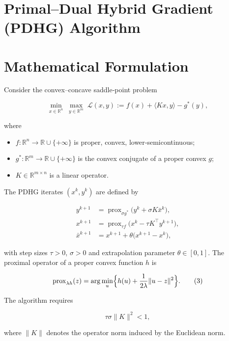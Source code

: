 \documentclass{article}
\newcommand{\prox}{\operatorname{prox}}
\begin{document}
\section*{Primal–Dual Hybrid Gradient (PDHG) Algorithm}

\section*{Mathematical Formulation}
Consider the convex–concave saddle‑point problem  

\[
\min_{x\in\mathbb{R}^n}\;\max_{y\in\mathbb{R}^m}
\; \mathcal{L}(x,y):= f(x)+\langle Kx , y\rangle - g^{*}(y),
\tag{1}
\]

where  

\begin{itemize}[noitemsep]
\item $f:\mathbb{R}^{n}\to\mathbb{R}\cup\{+\infty\}$ is proper, convex, lower‑semicontinuous;
\item $g^{*}:\mathbb{R}^{m}\to\mathbb{R}\cup\{+\infty\}$ is the convex conjugate of a proper convex $g$;
\item $K\in\mathbb{R}^{m\times n}$ is a linear operator.
\end{itemize}

The PDHG iterates $(x^{k},y^{k})$ are defined by  

\[
\boxed{
\begin{aligned}
y^{k+1} &= \prox_{\sigma g^{*}}\!\bigl(y^{k}+\sigma K\bar x^{k}\bigr),\\[4pt]
x^{k+1} &= \prox_{\tau f}\!\bigl(x^{k}-\tau K^{\top} y^{k+1}\bigr),\\[4pt]
\bar x^{k+1} &= x^{k+1}+ \theta\bigl(x^{k+1}-x^{k}\bigr),
\end{aligned}}
\tag{2}
\]

with step sizes $\tau>0$, $\sigma>0$ and extrapolation parameter $\theta\in[0,1]$.  
The proximal operator of a proper convex function $h$ is  

\[
\prox_{\lambda h}(z)=\arg\min_{u}\Bigl\{h(u)+\frac{1}{2\lambda}\|u-z\|^{2}\Bigr\}.
\tag{3}
\]

The algorithm requires  

\[
\tau\sigma\|K\|^{2}<1,
\tag{4}
\]

where $\|K\|$ denotes the operator norm induced by the Euclidean norm.
\end{document}
